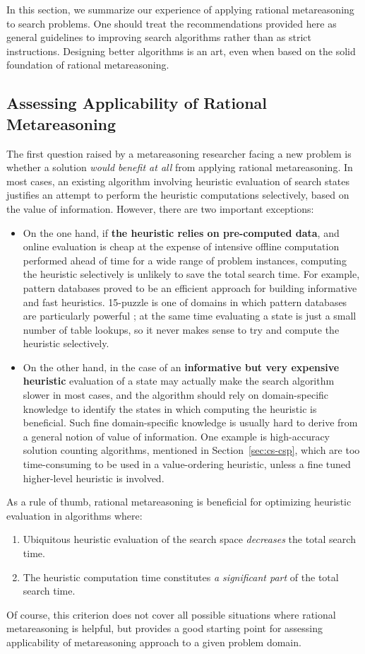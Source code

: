 In this section, we summarize our experience of applying rational
metareasoning to search problems. One should treat the recommendations
provided here as general guidelines to improving search algorithms
rather than as strict instructions. Designing better algorithms is an
art, even when based on the solid foundation of rational
metareasoning.

\subsection{Assessing Applicability of Rational Metareasoning}

The first question raised by a metareasoning researcher facing a new
problem is whether a solution \emph{would benefit at all} from
applying rational metareasoning. In most cases, an existing algorithm
involving heuristic evaluation of search states justifies an attempt
to perform the heuristic computations selectively, based on the value
of information. However, there are two important exceptions:
\begin{itemize}
\item On the one hand, if \textbf{the heuristic relies on pre-computed
  data}, and online evaluation is cheap at the expense of intensive
  offline computation performed ahead of time for a wide
  range of problem instances, computing the heuristic selectively is
  unlikely to save the total search time. For example, pattern
  databases \cite{pattern} proved to be an efficient approach for
  building informative and fast heuristics. 15-puzzle is one of
  domains in which pattern databases are particularly powerful
  \cite{Felner.apdb}; at the same time evaluating a state is just a
  small number of table lookups, so it never makes sense to try and
  compute the heuristic selectively.
\item On the other hand, in the case of an \textbf{informative but
  very expensive heuristic} evaluation of a state may
  actually make the search algorithm slower in most cases, and the
  algorithm should rely on domain-specific knowledge to
  identify the states in which computing the heuristic is beneficial. 
  Such fine domain-specific knowledge is usually hard to derive from
  a general notion of value of information. One example is
  high-accuracy solution counting algorithms, mentioned in
  Section~\ref{sec:cs-csp}, which are too time-consuming to be used
  in a value-ordering heuristic, unless a fine tuned higher-level
  heuristic is involved.
\end{itemize}
As a rule of thumb, rational metareasoning is beneficial for
optimizing heuristic evaluation in algorithms where:
\begin{enumerate}
\item Ubiquitous heuristic evaluation of the search space \emph{decreases} the total search
  time.
\item The heuristic computation time constitutes \emph{a significant part} of
  the total search time. 
\end{enumerate}
Of course, this criterion does not cover all possible situations where
rational metareasoning is helpful, but provides a good starting point
for assessing applicability of metareasoning approach to a given
problem domain.

